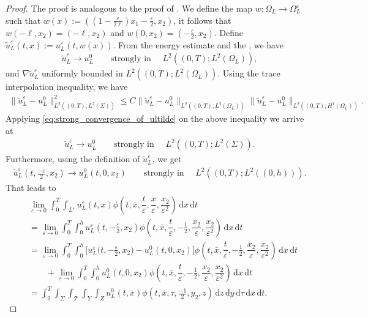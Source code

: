 \documentclass[11pt]{article}
\def\es{\varepsilon}
\def\oll{\Omega_L^\varepsilon}
\def\mol{\Omega_L}
\def\mint{\int_{0}^{T}\int_{\Sigma}\int_{\mathcal{T}}\int_{Y}\int_{Z}}
\def\dzdy{\di{z}\di{y}\di{\tau}\di{\overline{x}}\di{t}}
\newcommand{\di}[1]{\,\mathrm{d}#1}
\begin{document}
\begin{proof}
 The proof is analogous to the proof of \cite[Proposition 2.1]{neuss2007effective}. 
We define the map $w:\Omega_L\rightarrow\oll$ such that $w(x):=\left((1-\frac{\es}{2\ell})x_1-\frac{\es}{2},x_2\right)$, it follows that $w(-\ell,x_2)=(-\ell,x_2)$ and $w(0,x_2)=(-\frac{\es}{2},x_2).$  Define $\widetilde{u}_L^\es(t,x):={u}_L^\es(t,w(x))$. From the energy estimate and the , we have
\begin{align}\label{eq:strong_convergence_of_ultilde}
    \widetilde{u}_L^\es\rightarrow u_L^0 \qquad\mbox{strongly in } \quad L^2((0,T);L^2(\Omega_L)),
\end{align}
and  $\nabla \widetilde{u}_L^\es$ uniformly bounded in $L^2((0,T);L^2(\Omega_L)).$
Using the trace interpolation inequality, we have 
\begin{align*}
    \|\widetilde{u}_L^\es-u_L^0\|_{L^2((0,T);L^2(\Sigma))}^2\leq C\|\widetilde{u}_L^\es-u_L^0\|_{L^2((0,T);L^2(\Omega_L))}\|\widetilde{u}_L^\es-u_L^0\|_{L^2((0,T);H^1(\mol))}.
\end{align*}
Applying \eqref{eq:strong_convergence_of_ultilde} on the above inequality we arrive at
\begin{align*}
    \widetilde{u}_L^\es\rightarrow u_L^0 \qquad\mbox{strongly in } \quad L^2((0,T);L^2(\Sigma)).
\end{align*}
Furthermore, using the definition of $\widetilde{u}_L^\es$, we get
\begin{align*}
    \widetilde{u}_L^\es\left(t,\frac{-\es}{2},x_2\right)\rightarrow u_L^0 (t,0,x_2)\qquad\mbox{strongly in } \quad L^2((0,T);L^2((0,h))).
\end{align*}
That leads to
\begin{align*}
     &\!\!\!\!\lim_{\es \rightarrow 0} \int_0^T\int_{L^\es} u_L^\es(t,x)\phi\left(t,\overline{x},\dfrac{t}{\es}, \dfrac{x}{\es},\dfrac{x_2}{\es^2}\right)\di{x}\di{t}\\
     &= \lim_{\es \rightarrow 0} \int_0^T\int_{0}^h u_L^\es(t,-\frac{\es}{2},x_2)\phi\left(t,\bar x,\dfrac{t}{\es},-\frac{1}{2}, \dfrac{x_2}{\es},\dfrac{x_2}{\es^2}\right)\di{x}\di{t}\\
      &=\lim_{\es \rightarrow 0} \int_0^T\int_{0}^h \Big[u_L^\es\Big(t,-\frac{\es}{2},x_2\Big)-u_L^0(t,0,x_2)\Big]\phi\left(t,\bar x,\dfrac{t}{\es},-\frac{1}{2}, \dfrac{x_2}{\es},\dfrac{x_2}{\es^2}\right)\di{x}\di{t}\\
      &\qquad+\lim_{\es \rightarrow 0} \int_0^T\int_{0}^h u_L^0(t,0,x_2)\phi\left(t,\bar x,\dfrac{t}{\es},-\frac{1}{2}, \dfrac{x_2}{\es},\dfrac{x_2}{\es^2}\right)\di{x}\di{t}\\
      &=\mint u_L^0(t,\overline{x})\phi(t,\bar x,\tau,\tfrac {-1}2,y_2,z)\dzdy.
\end{align*}



 
\end{proof}
\end{document}
